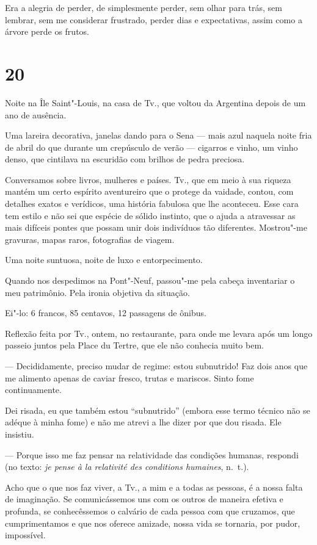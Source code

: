 Era a alegria de perder, de simplesmente perder, sem olhar para trás,
sem lembrar, sem me considerar frustrado, perder dias e expectativas,
assim como a árvore perde os frutos.

\section{20}

Noite na Île Saint"-Louis, na casa de Tv., que voltou da Argentina depois
de um ano de ausência.

Uma lareira decorativa, janelas dando para o Sena --- mais azul naquela
noite fria de abril do que durante um crepúsculo de verão --- cigarros e
vinho, um vinho denso, que cintilava na escuridão com brilhos de pedra
preciosa.

Conversamos sobre livros, mulheres e países. Tv., que em meio à sua
riqueza mantém um certo espírito aventureiro que o protege da vaidade,
contou, com detalhes exatos e verídicos, uma história fabulosa que lhe
aconteceu. Esse cara tem estilo e não sei que espécie de sólido
instinto, que o ajuda a atravessar as mais difíceis pontes que possam
unir dois indivíduos tão diferentes. Mostrou"-me gravuras, mapas raros,
fotografias de viagem.

Uma noite suntuosa, noite de luxo e entorpecimento.

Quando nos despedimos na Pont"-Neuf, passou"-me pela cabeça inventariar o
meu patrimônio. Pela ironia objetiva da situação.

Ei"-lo: 6 francos, 85 centavos, 12 passagens de ônibus.

\asterisc

Reflexão feita por Tv., ontem, no restaurante, para onde me levara após
um longo passeio juntos pela Place du Tertre, que ele não conhecia muito
bem.

--- Decididamente, preciso mudar de regime: estou subnutrido! Faz dois anos que me alimento apenas de caviar fresco, trutas e mariscos. Sinto fome continuamente.

Dei risada, eu que também estou ``subnutrido'' (embora esse termo
técnico não se adéque à minha fome) e não me atrevi a lhe dizer por que
dou risada. Ele insistiu.

--- Porque isso me faz pensar na relatividade das condições humanas, respondi (no texto: \emph{je pense à la relativité des conditions humaines}, n.~t.).

\asterisc

Acho que o que nos faz viver, a Tv., a mim e a todas as pessoas, é a
nossa falta de imaginação. Se comunicássemos uns com os outros de
maneira efetiva e profunda, se conhecêssemos o calvário de cada pessoa
com que cruzamos, que cumprimentamos e que nos oferece amizade, nossa
vida se tornaria, por pudor, impossível.

